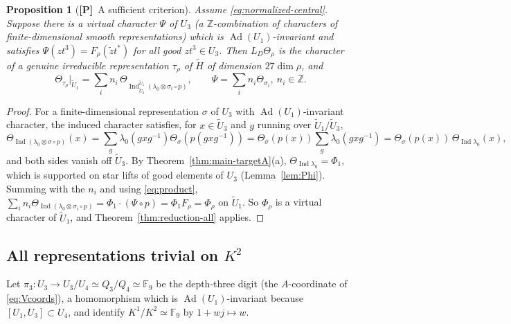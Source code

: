 \documentclass[11pt]{article}
\newcommand{\Z}{\mathbb Z}
\newcommand{\Fq}{\mathbb F}
\newcommand{\Ind}{\operatorname{Ind}}
\newcommand{\Ad}{\operatorname{Ad}}
\newcommand{\tH}{\widetilde H}
\newcommand{\tU}{\widetilde U}
\newcommand{\Ptag}{\textnormal{\textbf{[P]}}}
\theoremstyle{plain}
\newtheorem{proposition}[theorem]{Proposition}
\theoremstyle{definition}
\begin{document}
\begin{proposition}[\Ptag\ A sufficient criterion]\label{prop:criterion}
Assume \eqref{eq:normalized-central}.  Suppose there is a virtual
character $\Psi$ of $U_3$ (a $\Z$-combination of characters of
finite-dimensional smooth representations) which is $\Ad(U_1)$-invariant
and satisfies $\Psi(zt^3)=F_\rho(\tilde zt^*)$ for all good $zt^3\in U_3$.
Then $L_D\Theta_\rho$ is the character of a genuine irreducible
representation $\tau_\rho$ of $\tH$ of dimension $27\dim\rho$, and
\begin{equation}\label{eq:tau-rho}
 \Theta_{\tau_\rho}|_{\tU_1}=\sum_i n_i\,\Theta_{\Ind_{\tU_3}^{\tU_1}(\lambda_0\otimes\sigma_i\circ p)},
 \qquad \Psi=\sum_i n_i\Theta_{\sigma_i},\ n_i\in\Z .
\end{equation}
\end{proposition}
\begin{proof}
For a finite-dimensional representation $\sigma$ of $U_3$ with
$\Ad(U_1)$-invariant character, the induced character satisfies, for
$x\in\tU_3$ and $g$ running over $\tU_1/\tU_3$,
\[
 \Theta_{\Ind(\lambda_0\otimes\sigma\circ p)}(x)=\sum_g\lambda_0(gxg^{-1})\Theta_\sigma(p(gxg^{-1}))
 =\Theta_\sigma(p(x))\sum_g\lambda_0(gxg^{-1})=\Theta_\sigma(p(x))\,\Theta_{\Ind\lambda_0}(x),
\]
and both sides vanish off $\tU_3$.  By Theorem~\ref{thm:main-targetA}(a),
$\Theta_{\Ind\lambda_0}=\Phi_1$, which is supported on star lifts of good
elements of $U_3$ (Lemma~\ref{lem:Phi}).  Summing with the $n_i$ and
using \eqref{eq:product}, $\sum_in_i\Theta_{\Ind(\lambda_0\otimes\sigma_i\circ p)}=\Phi_1\cdot(\Psi\circ p)=\Phi_1F_\rho=\Phi_\rho$
on $\tU_1$.  So $\Phi_\rho$ is a virtual character of $\tU_1$, and
Theorem~\ref{thm:reduction-all} applies.
\end{proof}

\subsection{All representations trivial on $K^2$}
Let $\pi_3:U_3\to U_3/U_4\simeq Q_3/Q_4\simeq\Fq_9$ be the depth-three
digit (the $A$-coordinate of \eqref{eq:Vcoords}), a homomorphism which
is $\Ad(U_1)$-invariant because $[U_1,U_3]\subset U_4$, and identify
$K^1/K^2\simeq\Fq_9$ by $1+wj\mapsto w$.
\end{document}
